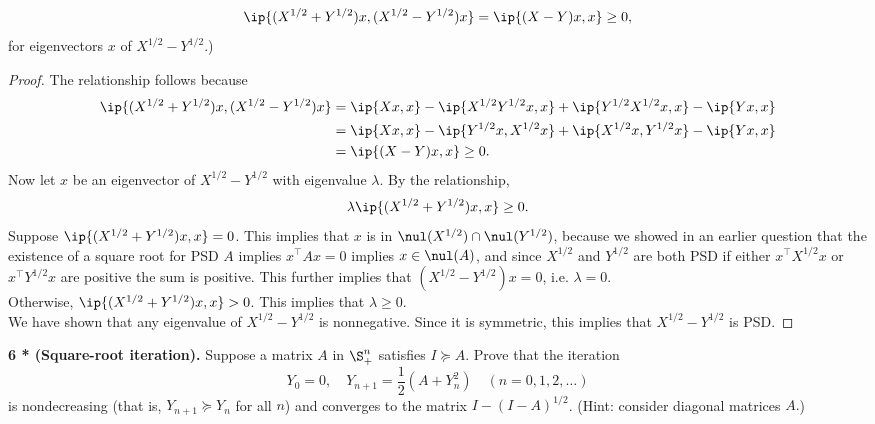 \documentclass[../borwein-lewis_notes.tex]{subfiles}
\begin{document}
\begin{enumerate}[(a)]
\begin{equation*}
\ip{(X^{1/2}+Y^{1/2})x, (X^{1/2}-Y^{1/2})x} = \ip{(X-Y)x,x}\geq 0,
\end{equation*}
for eigenvectors $x$ of $X^{1/2}-Y^{1/2}$.)
\begin{proof}
The relationship follows because 
\begin{align*}
\ip{(X^{1/2}+Y^{1/2})x, (X^{1/2}-Y^{1/2})x} &= 
\ip{Xx,x} -\ip{X^{1/2}Y^{1/2}x, x} + \ip{Y^{1/2}X^{1/2}x, x}
- \ip{Yx,x}\\
&=\ip{Xx,x} -\ip{Y^{1/2}x, X^{1/2}x} + \ip{X^{1/2}x, Y^{1/2}x} 
- \ip{Yx,x}\\ &= \ip{(X-Y)x,x}\geq 0.
\end{align*}
Now let $x$ be an eigenvector of $X^{1/2}-Y^{1/2}$ with eigenvalue 
$\lambda$. By the relationship, 
\begin{equation*}
\lambda \ip{(X^{1/2}+Y^{1/2})x, x} \geq 0.
\end{equation*}
Suppose $\ip{(X^{1/2}+Y^{1/2})x,x} = 0$. This implies that $x$
is in $\nul(X^{1/2})\cap\nul(Y^{1/2})$, because we showed in an 
earlier question that the existence of a square root 
for PSD $A$ implies $x^\top Ax=0$ implies $x\in\nul(A)$, and 
since $X^{1/2}$ and $Y^{1/2}$ are both PSD if either $x^\top X^{1/2} x$ 
or $x^\top Y^{1/2} x$ are positive the sum is positive. This further 
implies that $(X^{1/2}-Y^{1/2})x = 0$, i.e. $\lambda = 0$. \\
Otherwise, $\ip{(X^{1/2}+Y^{1/2})x, x} > 0$. This implies that 
$\lambda \geq 0$. \\
We have shown that any eigenvalue of $X^{1/2}-Y^{1/2}$ is nonnegative.
Since it is symmetric, this implies that $X^{1/2}-Y^{1/2}$ is PSD.
\end{proof}
\end{enumerate}\noindent
\textbf{6 * (Square-root iteration).} Suppose a matrix $A$ in $\S_+^n$ 
satisfies $I\succeq A$. Prove that the iteration 
\begin{equation*}
Y_0=0,\quad Y_{n+1} = \frac{1}{2}(A+Y^2_n) \quad (n=0,1,2,\ldots)
\end{equation*}
is nondecreasing (that is, $Y_{n+1}\succeq Y_n$ for all $n$) and 
converges to the matrix $I-(I-A)^{1/2}$. (Hint: consider diagonal 
matrices $A.$)
\end{document}
